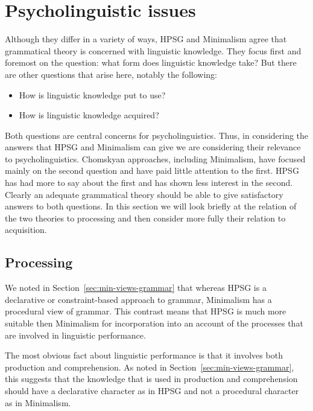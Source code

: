 \documentclass[output=paper]{langsci/langscibook}
\begin{document}
\section{Psycholinguistic issues}
\label{sec-psycho}

Although they differ in a variety of ways, HPSG and Minimalism agree that grammatical theory is
concerned with linguistic knowledge. They focus first and foremost on the question: what form does
linguistic knowledge take? But there are other questions that arise here, notably the following: 

\begin{itemize}
\item How is linguistic knowledge put to use? 
\item How is linguistic knowledge acquired?
\end{itemize}

\noindent
Both questions are central concerns for psycholinguistics. Thus, in considering the answers that
HPSG and Minimalism can give we are considering their relevance to psycholinguistics. Chomskyan
approaches, including Minimalism, have focused mainly on the second question and have paid little
attention to the first. HPSG has had more to say about the first and has shown less interest in the
second. Clearly an adequate grammatical theory should be able to give satisfactory answers to both
questions. In this section we will look briefly at the relation of the two theories to processing
and then consider more fully their relation to acquisition.


\subsection{Processing}
\label{sec-minimalism-processing}

We noted in Section~\ref{sec:min-views-grammar} that whereas HPSG is a declarative or constraint-based approach to grammar,
Minimalism has a procedural view of grammar. This contrast means that HPSG is much more suitable
then Minimalism for incorporation into an account of the processes that are involved in linguistic
performance.

	The most obvious fact about linguistic performance is that it involves both production and comprehension. As noted in Section~\ref{sec:min-views-grammar}, this suggests that the knowledge that is used in production and comprehension should have a declarative character as in HPSG and not a procedural character as in Minimalism. 
\end{document}
